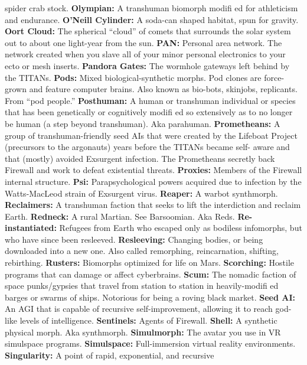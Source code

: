 spider crab stock.
\textbf{ Olympian:} A transhuman biomorph modiﬁ ed for athleticism and endurance.
\textbf{ O'Neill Cylinder:} A soda-can shaped habitat, spun for 
gravity.
\textbf{ Oort Cloud:} The spherical ``cloud'' of comets that 
surrounds the solar system out to about one light-year 
from the sun. 
\textbf{ PAN:} Personal area network. The network created when 
you slave all of your minor personal electronics to your 
ecto or mesh inserts.
\textbf{ Pandora Gates:} The wormhole gateways left behind by 
the TITANs.
\textbf{ Pods:} Mixed biological-synthetic morphs. Pod clones are 
force-grown and feature computer brains. Also known as 
bio-bots, skinjobs, replicants. From ``pod people.''
\textbf{ Posthuman:} A human or transhuman individual or 
species that has been genetically or cognitively modiﬁ ed 
so extensively as to no longer be human (a step beyond 
transhuman). Aka parahuman.
\textbf{ Prometheans:} A group of transhuman-friendly seed AIs 
that were created by the Lifeboat Project (precursors to 
the argonauts) years before the TITANs became self-
aware and that (mostly) avoided Exsurgent infection. The 
Prometheans secretly back Firewall and work to defeat 
existential threats.
\textbf{ Proxies:} Members of the Firewall internal structure.
\textbf{ Psi:} Parapsychological powers acquired due to infection 
by the Watts-MacLeod strain of Exsurgent virus.
\textbf{ Reaper:} A warbot synthmorph.
\textbf{ Reclaimers:} A transhuman faction that seeks to lift the 
interdiction and reclaim Earth.
\textbf{ Redneck:} A rural Martian. See Barsoomian. Aka Reds.
\textbf{ Re-instantiated:} Refugees from Earth who escaped 
only as bodiless infomorphs, but who have since been 
resleeved.
\textbf{ Resleeving:} Changing bodies, or being downloaded into 
a new one. Also called remorphing, reincarnation, shifting, 
rebirthing.
\textbf{ Rusters:} Biomorphs optimized for life on Mars.
\textbf{ Scorching:} Hostile programs that can damage or affect 
cyberbrains.
\textbf{ Scum:} The nomadic faction of space punks/gypsies that 
travel from station to station in heavily-modiﬁ ed barges 
or swarms of ships. Notorious for being a roving black 
market.
\textbf{ Seed AI:} An AGI that is capable of recursive self-improvement, allowing it to reach god-like levels of intelligence.
\textbf{ Sentinels:} Agents of Firewall.
\textbf{ Shell:} A synthetic physical morph. Aka synthmorph.
\textbf{ Simulmorph:} The avatar you use in VR simulspace 
programs.
\textbf{ Simulspace:} Full-immersion virtual reality environments.
\textbf{ Singularity:} A point of rapid, exponential, and recursive 
